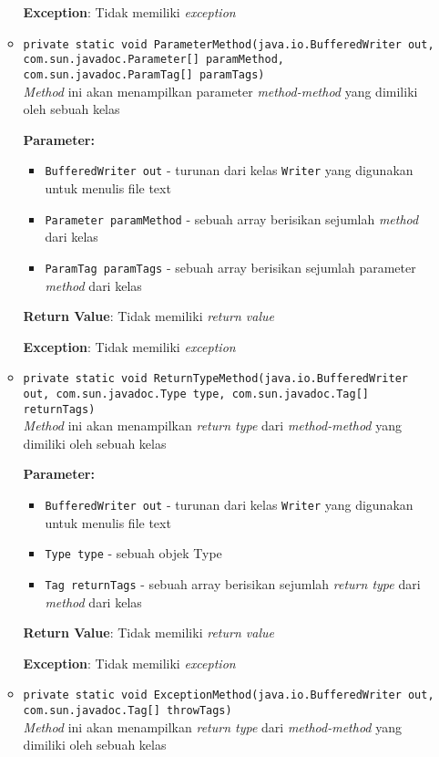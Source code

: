 \begin{enumerate}
\begin{itemize}
\textbf{Exception}: Tidak memiliki \textit{exception}

\item \texttt{private static void ParameterMethod(java.io.BufferedWriter out, com.sun.javadoc.Parameter[] paramMethod, com.sun.javadoc.ParamTag[] paramTags)}\\ 
\textit{Method} ini akan menampilkan parameter \textit{method-method} yang dimiliki
 oleh sebuah kelas

\textbf{Parameter:}
\begin{itemize}
\item \texttt{BufferedWriter out} - 
turunan dari kelas \texttt{Writer} yang digunakan untuk menulis file text
\item \texttt{Parameter paramMethod} - 
sebuah array berisikan sejumlah \textit{method} dari kelas
\item \texttt{ParamTag paramTags} - 
sebuah array berisikan sejumlah parameter \textit{method} dari kelas
\end{itemize}
\textbf{Return Value}: Tidak memiliki \textit{return value}

\textbf{Exception}: Tidak memiliki \textit{exception}

\item \texttt{private static void ReturnTypeMethod(java.io.BufferedWriter out, com.sun.javadoc.Type type, com.sun.javadoc.Tag[] returnTags)}\\ 
\textit{Method} ini akan menampilkan \textit{return type} dari \textit{method-method} yang dimiliki
 oleh sebuah kelas

\textbf{Parameter:}
\begin{itemize}
\item \texttt{BufferedWriter out} - 
turunan dari kelas \texttt{Writer} yang digunakan untuk menulis file text
\item \texttt{Type type} - 
sebuah objek Type
\item \texttt{Tag returnTags} - 
sebuah array berisikan sejumlah \textit{return type} dari \textit{method} dari kelas
\end{itemize}
\textbf{Return Value}: Tidak memiliki \textit{return value}

\textbf{Exception}: Tidak memiliki \textit{exception}

\item \texttt{private static void ExceptionMethod(java.io.BufferedWriter out, com.sun.javadoc.Tag[] throwTags)}\\ 
\textit{Method} ini akan menampilkan \textit{return type} dari \textit{method-method} yang dimiliki
 oleh sebuah kelas


\end{itemize}
\end{enumerate}
